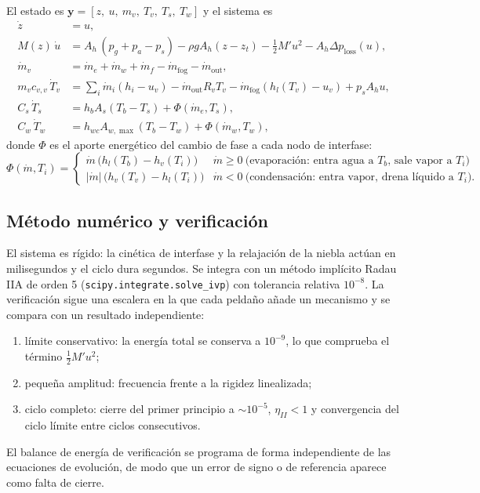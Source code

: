 \documentclass[11pt,a4paper]{article}
\newcommand{\mdot}{\dot m}
\begin{document}
El estado es $\mathbf{y}=[z,\ u,\ m_v,\ T_v,\ T_s,\ T_w]$ y el sistema es
\begin{align}
\dot z &= u,\\
M(z)\,\dot u &= A_h\,(p_g + p_a - p_s) - \rho g A_h (z-z_t) - \tfrac12 M'u^2 - A_h\Delta p_{\mathrm{loss}}(u),\\
\dot m_v &= \mdot_e + \mdot_w + \mdot_f - \mdot_{\mathrm{fog}} - \mdot_{\mathrm{out}},\\
m_v c_{v,v}\,\dot T_v &= \textstyle\sum_i \mdot_i(h_i-u_v) - \mdot_{\mathrm{out}}R_vT_v - \mdot_{\mathrm{fog}}(h_l(T_v)-u_v) + p_sA_hu,\\
C_s\,\dot T_s &= h_b A_s (T_b - T_s) + \Phi(\mdot_e, T_s),\\
C_w\,\dot T_w &= h_{wc} A_{w,\max}(T_b - T_w) + \Phi(\mdot_w, T_w),
\end{align}
donde $\Phi$ es el aporte energético del cambio de fase a cada nodo de interfase:
\begin{equation}
\Phi(\mdot, T_i) = \begin{cases}\mdot\,\bigl(h_l(T_b) - h_v(T_i)\bigr) & \mdot\ge0\ \text{(evaporación: entra agua a } T_b\text{, sale vapor a } T_i)\\[2pt] |\mdot|\,\bigl(h_v(T_v) - h_l(T_i)\bigr) & \mdot<0\ \text{(condensación: entra vapor, drena líquido a } T_i).\end{cases}
\end{equation}

\subsection{Método numérico y verificación}

El sistema es rígido: la cinética de interfase y la relajación de la niebla actúan en milisegundos y el ciclo dura segundos. Se integra con un método implícito Radau IIA de orden 5 (\texttt{scipy.integrate.solve\_ivp}) con tolerancia relativa $10^{-8}$. La verificación sigue una escalera en la que cada peldaño añade un mecanismo y se compara con un resultado independiente:
\begin{enumerate}
\item límite conservativo: la energía total se conserva a $10^{-9}$, lo que comprueba el término $\tfrac12M'u^2$;
\item pequeña amplitud: frecuencia frente a la rigidez linealizada;
\item ciclo completo: cierre del primer principio a $\sim10^{-5}$, $\eta_{II}<1$ y convergencia del ciclo límite entre ciclos consecutivos.
\end{enumerate}
El balance de energía de verificación se programa de forma independiente de las ecuaciones de evolución, de modo que un error de signo o de referencia aparece como falta de cierre.
\end{document}
